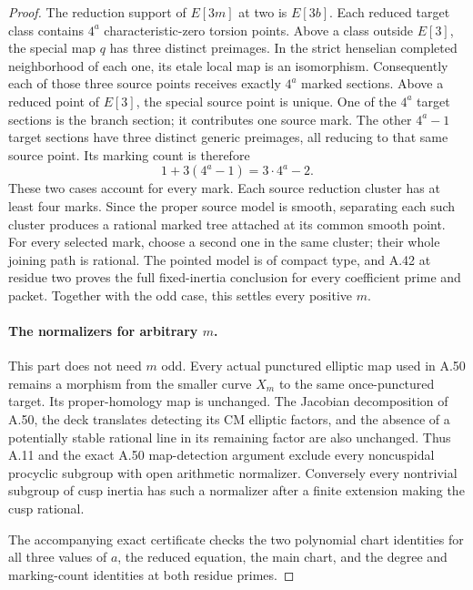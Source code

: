 \begin{proof}
The reduction support of \(E[3m]\) at two is \(E[3b]\). Each reduced
target class contains \(4^a\) characteristic-zero torsion points.
Above a class outside \(E[3]\), the special map \(q\) has three
distinct preimages. In the strict henselian completed neighborhood
of each one, its etale local map is an isomorphism. Consequently
each of those three source points receives exactly \(4^a\) marked
sections. Above a reduced point of \(E[3]\), the special source
point is unique. One of the \(4^a\) target sections is the branch
section; it contributes one source mark. The other \(4^a-1\) target
sections have three distinct generic preimages, all reducing to
that same source point. Its marking count is therefore
\[
                         1+3(4^a-1)=3\cdot4^a-2.    \tag{A.52.7}
\]
These two cases account for every mark. Each source reduction
cluster has at least four marks. Since the proper source model is
smooth, separating each such cluster produces a rational marked
tree attached at its common smooth point. For every selected mark,
choose a second one in the same cluster; their whole joining path
is rational. The pointed model is of compact type, and A.42 at
residue two proves the full fixed-inertia conclusion for every
coefficient prime and packet. Together with the odd case, this
settles every positive \(m\).

\paragraph{The normalizers for arbitrary \(m\).}
This part does not need \(m\) odd. Every actual punctured elliptic
map used in A.50 remains a morphism from the smaller curve \(X_m\)
to the same once-punctured target. Its proper-homology map is unchanged.
The Jacobian decomposition of A.50, the deck translates detecting
its CM elliptic factors, and the absence of a potentially stable
rational line in its remaining factor are also unchanged. Thus
A.11 and the exact A.50 map-detection argument exclude every
noncuspidal procyclic subgroup with open arithmetic normalizer.
Conversely every nontrivial subgroup of cusp inertia has such a
normalizer after a finite extension making the cusp rational.

The accompanying exact certificate checks the two polynomial chart
identities for all three values of \(a\), the reduced equation,
the main chart, and the degree and marking-count identities at both
residue primes.
\end{proof}
